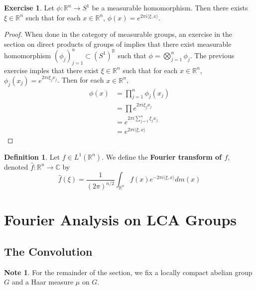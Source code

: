 \documentclass[12pt]{amsart}
\theoremstyle{definition}
\newtheorem{defn}[definition]{Definition}
\newtheorem{note}[definition]{Note}
\newtheorem{ex}[definition]{Exercise}
\newcommand{\C}{\mathbb{C}}
\newcommand{\R}{\mathbb{R}}
\renewcommand{\r}{\rangle}
\renewcommand{\l}{\langle}
\newcommand{\lex}[1]{\label{ex:#1}}
\newcommand{\ld}[1]{\label{defn:#1}}
\begin{document}
	\begin{ex}
	\lex{301} Let $\phi: \R^n \rightarrow S^1$ be a measurable homomorphism. Then there exists $\xi \in \R^n$ such that for each $x \in \R^n$, $\phi(x) = e^{2 \pi i \l \xi, x\r}$. 
	\end{ex}	
	
	\begin{proof}
	When done in the category of measurable groups, an exercise in the section on direct products of groups of \cite{groups}
	implies that there exist measurable homomorphism $(\phi_{j})_{j=1}^n \subset (S^1)^{\R}$ such that $\phi = \bigotimes_{j=1}^n \phi_j$. The previous exercise imples that there exist $\xi \in \R^n$ such that for each $x \in \R^n$, $\phi_j(x_j) = e^{2 \pi i \xi_j x_j}$. Then for each $x \in \R^n$, 
	\begin{align*}
	\phi(x)
	&= \prod_{j=1}^n \phi_j(x_j) \\
	&= \prod e^{2 \pi i \xi_j x_j} \\
	&= e^{2 \pi i \sum\limits_{j=1}^n  \xi_j x_j }\\
	&= e^{2 \pi i \l \xi, x \r}
	\end{align*}
	\end{proof}
	
	\begin{defn}
	\ld{302} Let $f \in L^1(\R^n)$. We define the \textbf{Fourier transform of $f$}, denoted $\hat{f}: \R^n \rightarrow \C$ by 
	$$\hat{f}(\xi) = \frac{1}{(2 \pi)^{n / 2}} \int_{\R^n} f(x) e^{- 2 \pi i \l \xi , x\r} dm(x)$$
	\end{defn}
	
	
	
	
	
	
	
	
	
	
	
	
	
	
	\newpage
	\section{Fourier Analysis on LCA Groups}
	
	
	

	\subsection{The Convolution}	
	\begin{note}
	For the remainder of the section, we fix a locally compact abelian group $G$ and a Haar measure $\mu$ on $G$. 
	\end{note}
	
\end{document}
